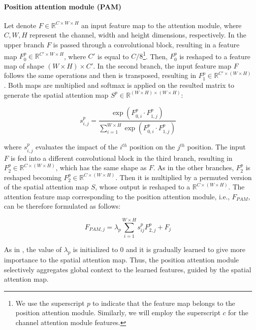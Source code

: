 \documentclass[journal]{IEEEtran}
\begin{document}
\paragraph*{\textbf{Position attention module (PAM)}}Let denote $F \in \mathbb{R}^{C\times W\times H}$ an input feature map to the attention module, where $C,W,H$ represent the channel, width and height dimensions, respectively. In the upper branch $F$ is passed through a convolutional block, resulting in a feature map $F_{0}^p \in \mathbb{R}^{C'\times W\times H}$, where $C'$ is equal to $C/8$\footnote{We use the superscript $p$ to indicate that the feature map belongs to the position attention module. Similarly, we will employ the superscript $c$ for the channel attention module features.}. Then, $F_{0}^p$ is reshaped to a feature map of shape $(W\times H)\times C'$. In the second branch, the input feature map $F$ follows the same operations and then is transposed, resulting in $F_{1}^p \in \mathbb{R}^{C'\times (W\times H)}$. Both maps are multiplied and softmax is applied on the resulted matrix to generate the spatial attention map $S^p \in \mathbb{R}^{(W \times H) \times (W \times H)}$:

\begin{equation}
    s_{i,j}^p = \frac{\exp{(F_{0,i}^p \cdot F_{1,j}^p)}}{\sum_{i=1}^{W \times H}\exp{(F_{0,i}^p \cdot F_{1,j}^p)}}
\end{equation}

where $s_{i,j}^p$ evaluates the impact of the $i^{th}$ position on the $j^{th}$ position. The input $F$ is fed into a different convolutional block in the third branch, resulting in $F_{2}^p \in \mathbb{R}^{C\times (W\times H)}$, which has the same shape as $F$. As in the other branches, $F_{2}^p$ is reshaped becoming $F_{2}^p \in \mathbb{R}^{C\times (W\times H)}$. Then it is multiplied by a permuted version of the spatial attention map $S$, whose output is reshaped to a $\mathbb{R}^{C\times (W\times H)}$. The attention feature map corresponding to the position attention module, i.e., $F_{PAM}$, can be therefore formulated as follows:

\begin{equation}
    F_{PAM,j} = \lambda_p\sum_{i=1}^{W\times H}s_{ij}^pF_{2,j}^p + F_j
\end{equation}

As in \cite{fu2018dual}, the value of $\lambda_p$ is initialized to 0 and it is gradually learned to give more importance to the spatial attention map. Thus, the position attention module selectively aggregates global context to the learned features, guided by the spatial attention map. 
\end{document}
